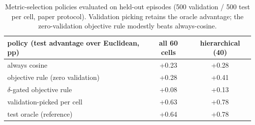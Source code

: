 \begin{table}[H]
\centering
\small
\begin{tabular}{lcc}
\toprule
policy (test advantage over Euclidean, pp) & all 60 cells & hierarchical (40) \\
\midrule
always cosine & +0.23 & +0.28 \\
objective rule (zero validation) & +0.28 & +0.41 \\
$\delta$-gated objective rule & +0.08 & +0.13 \\
validation-picked per cell & +0.63 & +0.78 \\
test oracle (reference) & +0.64 & +0.78 \\
\bottomrule
\end{tabular}
\caption{Metric-selection policies evaluated on held-out episodes (500 validation / 500 test per cell, paper protocol). Validation picking retains the oracle advantage; the zero-validation objective rule modestly beats always-cosine.}
\label{tab:b8-valpick}
\end{table}
